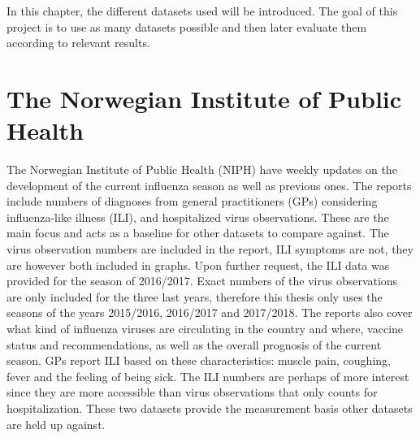 In this chapter, the different datasets used will be introduced. The goal of this project is to use as many datasets possible and then later evaluate them according to relevant results.

\section{The Norwegian Institute of Public Health}
The Norwegian Institute of Public Health (NIPH) have weekly updates\cite{fhi} on the development of the current influenza season as well as previous ones. The reports include numbers of diagnoses from general practitioners (GPs) considering influenza-like illness (ILI), and hospitalized virus observations. These are the main focus and acts as a baseline for other datasets to compare against. The virus observation numbers are included in the report, ILI symptoms are not, they are however both included in graphs. Upon further request, the ILI data was provided for the season of 2016/2017. Exact numbers of the virus observations are only included for the three last years, therefore this thesis only uses the seasons of the years 2015/2016, 2016/2017 and 2017/2018. The reports also cover what kind of influenza viruses are circulating in the country and where, vaccine status and recommendations, as well as the overall prognosis of the current season. GPs report ILI based on these characteristics: muscle pain, coughing, fever and the feeling of being sick. The ILI numbers are perhaps of more interest since they are more accessible than virus observations that only counts for hospitalization. These two datasets provide the measurement basis other datasets are held up against.

